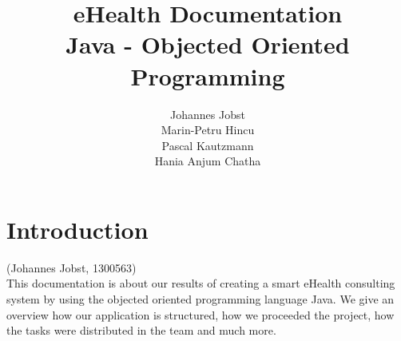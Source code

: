 \documentclass[a4paper, 12pt]{report}
\title{\textbf{eHealth Documentation}\\Java - Objected Oriented Programming}
\author{Johannes Jobst\\Marin-Petru Hincu\\Pascal Kautzmann\\Hania Anjum Chatha}
\begin{document}
\maketitle


\tableofcontents
\listoffigures

\chapter{Introduction}
{\tiny (Johannes Jobst, 1300563)\\}
This documentation is about our results of creating a smart eHealth consulting system by using the objected oriented programming language Java. We give an overview how our application is structured, how we proceeded the project, how the tasks were distributed in the team and much more.
\\
\\
\\
\end{document}
